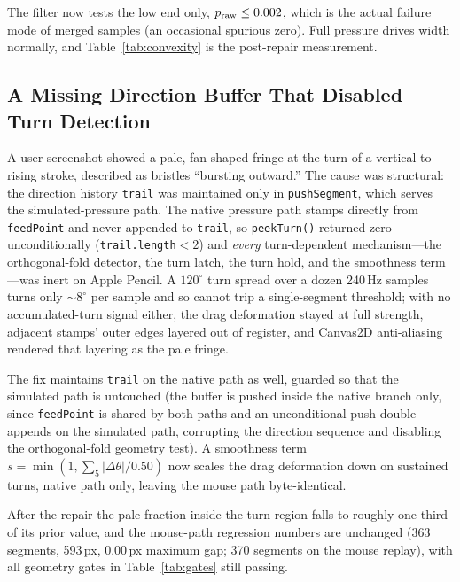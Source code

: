 \documentclass[conference]{IEEEtran}
\begin{document}
The filter now tests the low end only, $p_{\rm raw}\le0.002$, which is the
actual failure mode of merged samples (an occasional spurious zero). Full
pressure drives width normally, and Table~\ref{tab:convexity} is the
post-repair measurement.

\subsection{A Missing Direction Buffer That Disabled Turn Detection}

A user screenshot showed a pale, fan-shaped fringe at the turn of a
vertical-to-rising stroke, described as bristles ``bursting outward.'' The
cause was structural: the direction history \texttt{trail} was maintained only
in \texttt{pushSegment}, which serves the simulated-pressure path. The native
pressure path stamps directly from \texttt{feedPoint} and never appended to
\texttt{trail}, so \texttt{peekTurn()} returned zero unconditionally
(\texttt{trail.length}$<2$) and \emph{every} turn-dependent mechanism---the
orthogonal-fold detector, the turn latch, the turn hold, and the smoothness
term---was inert on Apple Pencil. A $120^{\circ}$ turn spread over a dozen
240\,Hz samples turns only $\sim\!8^{\circ}$ per sample and so cannot trip a
single-segment threshold; with no accumulated-turn signal either, the drag
deformation stayed at full strength, adjacent stamps' outer edges layered out
of register, and Canvas2D anti-aliasing rendered that layering as the pale
fringe.

The fix maintains \texttt{trail} on the native path as well, guarded so that
the simulated path is untouched (the buffer is pushed inside the native branch
only, since \texttt{feedPoint} is shared by both paths and an unconditional
push double-appends on the simulated path, corrupting the direction sequence
and disabling the orthogonal-fold geometry test). A smoothness term
$s=\min(1,\sum_{5}|{\Delta\theta}|/0.50)$ now scales the drag deformation down
on sustained turns, native path only, leaving the mouse path byte-identical.

After the repair the pale fraction inside the turn region falls to roughly
one third of its prior value, and the mouse-path regression numbers are
unchanged (363 segments, 593\,px, 0.00\,px maximum gap; 370 segments on the
mouse replay), with all geometry gates in Table~\ref{tab:gates} still passing.
\end{document}
